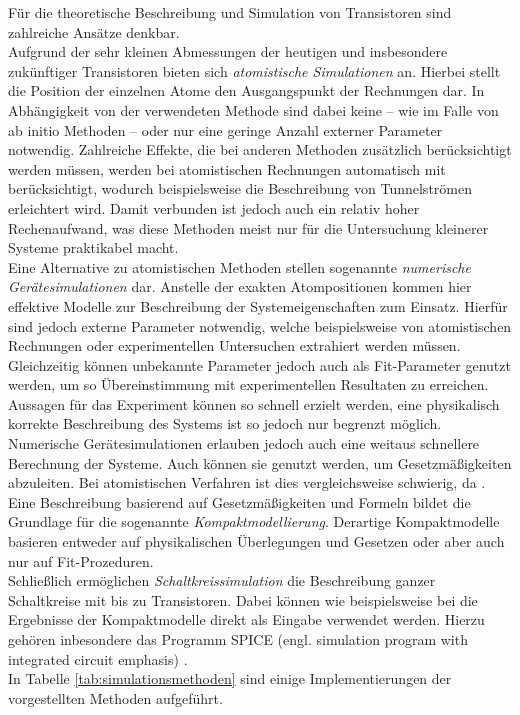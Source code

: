 Für die theoretische Beschreibung und Simulation von Transistoren sind zahlreiche Ansätze denkbar.\\
Aufgrund der sehr kleinen Abmessungen der heutigen und insbesondere zukünftiger Transistoren bieten sich \textit{atomistische Simulationen} an.
Hierbei stellt die Position der einzelnen Atome den Ausgangspunkt der Rechnungen dar.
In Abhängigkeit von der verwendeten Methode sind dabei keine -- wie im Falle von ab initio Methoden -- oder nur eine geringe Anzahl externer Parameter notwendig.
Zahlreiche Effekte, die bei anderen Methoden zusätzlich berücksichtigt werden müssen, werden bei atomistischen Rechnungen automatisch mit berücksichtigt, wodurch beispielsweise die Beschreibung von Tunnelströmen erleichtert wird.
Damit verbunden ist jedoch auch ein relativ hoher Rechenaufwand, was diese Methoden meist nur für die Untersuchung kleinerer Systeme praktikabel macht.\\
Eine Alternative zu atomistischen Methoden stellen sogenannte \textit{numerische Gerätesimulationen} dar.
Anstelle der exakten Atompositionen kommen hier effektive Modelle zur Beschreibung der Systemeigenschaften zum Einsatz.
Hierfür sind jedoch externe Parameter notwendig, welche beispielsweise von atomistischen Rechnungen oder experimentellen Untersuchen extrahiert werden müssen.
Gleichzeitig können unbekannte Parameter jedoch auch als Fit-Parameter genutzt werden, um so Übereinstimmung mit experimentellen Resultaten zu erreichen.
Aussagen für das Experiment können so schnell erzielt werden, eine physikalisch korrekte Beschreibung des Systems ist so jedoch nur begrenzt möglich.
Numerische Gerätesimulationen erlauben jedoch auch eine weitaus schnellere Berechnung der Systeme.
Auch können sie genutzt werden, um Gesetzmäßigkeiten abzuleiten. Bei atomistischen Verfahren ist dies vergleichsweise schwierig, da .\\
Eine Beschreibung basierend auf Gesetzmäßigkeiten und Formeln bildet die Grundlage für die sogenannte \textit{Kompaktmodellierung}.
Derartige Kompaktmodelle basieren entweder auf physikalischen Überlegungen und Gesetzen oder aber auch nur auf Fit-Prozeduren.\\
Schließlich ermöglichen \textit{Schaltkreissimulation} die Beschreibung ganzer Schaltkreise mit bis zu  Transistoren.
Dabei können wie beispielsweise bei  die Ergebnisse der Kompaktmodelle direkt als Eingabe verwendet werden.
Hierzu gehören inbesondere das Programm SPICE (engl. simulation program with integrated circuit emphasis) \cite{nagel_spice:_1973}.\\
In Tabelle \ref{tab:simulationsmethoden} sind einige Implementierungen der vorgestellten Methoden aufgeführt.


